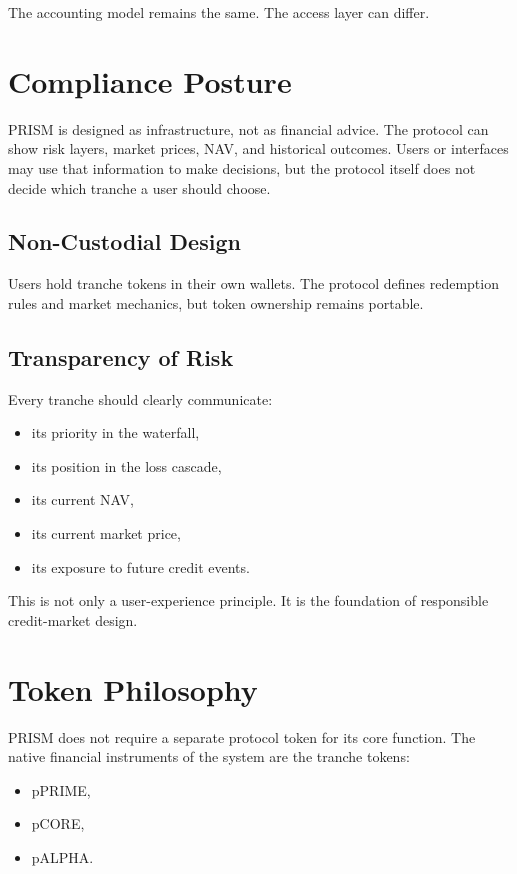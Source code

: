 \documentclass[11pt]{article}
\begin{document}
The accounting model remains the same. The access layer can differ.

\section{Compliance Posture}

PRISM is designed as infrastructure, not as financial advice. The protocol can
show risk layers, market prices, NAV, and historical outcomes. Users or
interfaces may use that information to make decisions, but the protocol itself
does not decide which tranche a user should choose.

\subsection{Non-Custodial Design}

Users hold tranche tokens in their own wallets. The protocol defines redemption
rules and market mechanics, but token ownership remains portable.

\subsection{Transparency of Risk}

Every tranche should clearly communicate:

\begin{itemize}
  \item its priority in the waterfall,
  \item its position in the loss cascade,
  \item its current NAV,
  \item its current market price,
  \item its exposure to future credit events.
\end{itemize}

This is not only a user-experience principle. It is the foundation of responsible
credit-market design.

\section{Token Philosophy}

PRISM does not require a separate protocol token for its core function. The
native financial instruments of the system are the tranche tokens:

\begin{itemize}
  \item pPRIME,
  \item pCORE,
  \item pALPHA.
\end{itemize}
\end{document}
